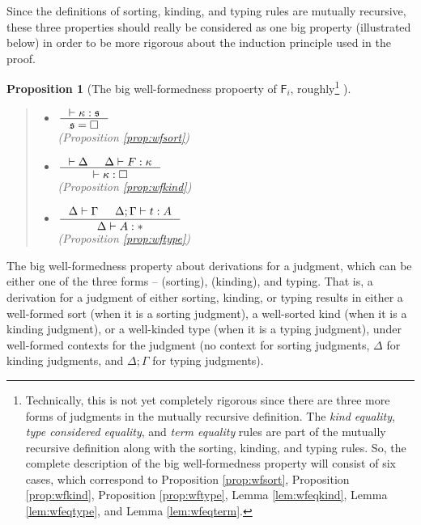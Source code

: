 \documentclass[preprint]{sigplanconf}
\newcommand{\Fi}{\ensuremath{\mathsf{F}_i}}
\theoremstyle{plain}
\newtheorem*{proposition*}{Proposition}
\theoremstyle{remark}
\theoremstyle{definition}
\begin{document}
Since the definitions of sorting, kinding, and typing rules are
mutually recursive, these three properties should really be considered as
one big property (illustrated below) in order to be more rigorous about
the induction principle used in the proof.
\begin{proposition*}[The big well-formedness propoerty of \Fi,
		roughly\footnote{Technically,
    this is not yet completely rigorous since there are three more forms of
    judgments in the mutually recursive definition. The \emph{kind equality},
    \emph{type considered equality}, and \emph{term equality} rules are part of
    the mutually recursive definition along with the sorting, kinding, and
    typing rules. So, the complete description of the big well-formedness
    property will consist of six cases, which correspond to
    Proposition \ref{prop:wfsort}, Proposition \ref{prop:wfkind},
    Proposition \ref{prop:wftype}, Lemma \ref{lem:wfeqkind},
    Lemma \ref{lem:wfeqtype}, and Lemma \ref{lem:wfeqterm}.  }  ]~
\begin{quote}
\begin{itemize}
\item[case] \fbox{$ |- \kappa : \square $}\qquad\quad
 $ \inference{ |- \kappa : \mathfrak{s} }{ \mathfrak{s}=\square } $\\
 \qquad\qquad (Proposition \ref{prop:wfsort})
\item[case] \qquad
 $ \inference{ |- \Delta & \Delta |- F : \kappa}{ |- \kappa:\square } $\\
 \qquad\qquad (Proposition \ref{prop:wfkind})
\item[case] \quad
 $ \inference{ \Delta |- \Gamma & \Delta;\Gamma |- t : A}{ \Delta |- A : * } $\\
 (Proposition \ref{prop:wftype})
\end{itemize}
\end{quote}
\end{proposition*}\noindent
The big well-formedness property about derivations for a judgment,
which can be either one of the three forms --
\fbox{$ |- \kappa : \square $} (sorting),
 (kinding), and
 typing.
That is, a derivation for a judgment of either sorting, kinding, or typing
results in either a well-formed sort (when it is a sorting judgment),
a well-sorted kind (when it is a kinding judgment), or
a well-kinded type (when it is a typing judgment),
under well-formed contexts for the judgment (no context for sorting judgments,
$\Delta$ for kinding judgments, and $\Delta;\Gamma$ for typing judgments).
\end{document}
